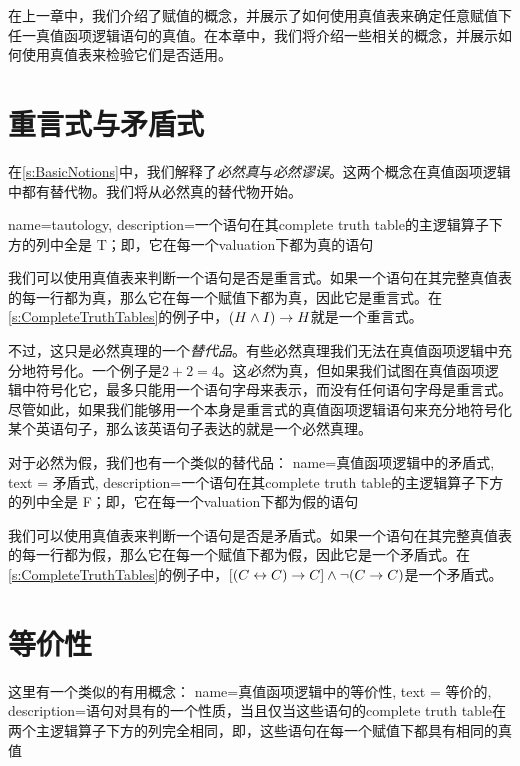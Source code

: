 在上一章中，我们介绍了赋值的概念，并展示了如何使用真值表来确定任意赋值下任一真值函项逻辑语句的真值。在本章中，我们将介绍一些相关的概念，并展示如何使用真值表来检验它们是否适用。

\section{重言式与矛盾式}
在\cref{s:BasicNotions}中，我们解释了\emph{必然真}与\emph{必然谬误}。这两个概念在真值函项逻辑中都有替代物。我们将从必然真的替代物开始。

{
name=tautology,
description={一个语句在其\gls{complete truth table}的主逻辑算子下方的列中全是 T；即，它在每一个\gls{valuation}下都为真的语句}
}

我们可以使用真值表来判断一个语句是否是重言式。如果一个语句在其完整真值表的每一行都为真，那么它在每一个赋值下都为真，因此它是重言式。在\cref{s:CompleteTruthTables}的例子中，$(H \wedge I) \rightarrow H$就是一个重言式。

不过，这只是必然真理的一个\emph{替代品}。有些必然真理我们无法在真值函项逻辑中充分地符号化。一个例子是$2 + 2 = 4$。这\emph{必然}为真，但如果我们试图在真值函项逻辑中符号化它，最多只能用一个语句字母来表示，而没有任何语句字母是重言式。尽管如此，如果我们能够用一个本身是重言式的真值函项逻辑语句来充分地符号化某个英语句子，那么该英语句子表达的就是一个必然真理。

对于必然为假，我们也有一个类似的替代品：
{
  name=真值函项逻辑中的矛盾式,
  text = 矛盾式,
description={一个语句在其\gls{complete truth table}的主逻辑算子下方的列中全是 F；即，它在每一个\gls{valuation}下都为假的语句}
}

我们可以使用真值表来判断一个语句是否是矛盾式。如果一个语句在其完整真值表的每一行都为假，那么它在每一个赋值下都为假，因此它是一个矛盾式。在\cref{s:CompleteTruthTables}的例子中，$[(C\leftrightarrow C) \rightarrow C] \wedge \neg(C \rightarrow C)$是一个矛盾式。

\section{等价性}\label{sec:equivalent}
这里有一个类似的有用概念：
{
  name=真值函项逻辑中的等价性,
  text = 等价的,
description={语句对具有的一个性质，当且仅当这些语句的\gls{complete truth table}在两个主逻辑算子下方的列完全相同，即，这些语句在每一个赋值下都具有相同的真值}
}


